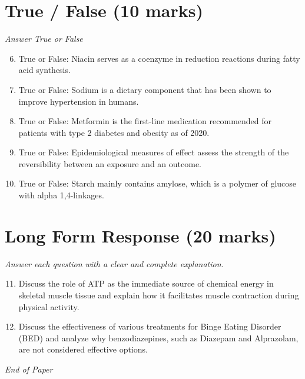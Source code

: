 \documentclass[12pt]{article}
\begin{document}
\section*{True / False (10 marks)}
\textit{Answer True or False}
\begin{enumerate}[label=\arabic*.]
\setcounter{enumi}{5}
\item True or False: Niacin serves as a coenzyme in reduction reactions during fatty acid synthesis.
\item True or False: Sodium is a dietary component that has been shown to improve hypertension in humans.
\item True or False: Metformin is the first-line medication recommended for patients with type 2 diabetes and obesity as of 2020.
\item True or False: Epidemiological measures of effect assess the strength of the reversibility between an exposure and an outcome.
\item True or False: Starch mainly contains amylose, which is a polymer of glucose with alpha 1,4-linkages.
\end{enumerate}

\section*{Long Form Response (20 marks)}
\textit{Answer each question with a clear and complete explanation.}
\begin{enumerate}[label=\arabic*.]
\setcounter{enumi}{10}
\item Discuss the role of ATP as the immediate source of chemical energy in skeletal muscle tissue and explain how it facilitates muscle contraction during physical activity.
\item Discuss the effectiveness of various treatments for Binge Eating Disorder (BED) and analyze why benzodiazepines, such as Diazepam and Alprazolam, are not considered effective options.
\end{enumerate}

\vfill
\noindent\textit{End of Paper}
\end{document}
